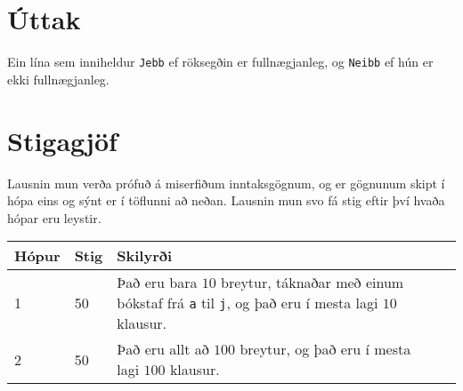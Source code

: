 \section*{Úttak}
Ein lína sem inniheldur \texttt{Jebb} ef röksegðin er fullnægjanleg, og \texttt{Neibb} ef hún er ekki fullnægjanleg.

\section*{Stigagjöf}
Lausnin mun verða prófuð á miserfiðum inntaksgögnum, og er gögnunum skipt í
hópa eins og sýnt er í töflunni að neðan. Lausnin mun svo fá stig eftir því
hvaða hópar eru leystir.

\begin{tabular}{|l|l|l|l|}
\hline
Hópur & Stig & Skilyrði \\ \hline
1     & 50   & Það eru bara $10$ breytur, táknaðar með einum bókstaf frá \texttt{a} til \texttt{j}, og það eru í mesta lagi $10$ klausur. \\ \hline
2     & 50   & Það eru allt að $100$ breytur, og það eru í mesta lagi $100$ klausur. \\ \hline
\end{tabular}

